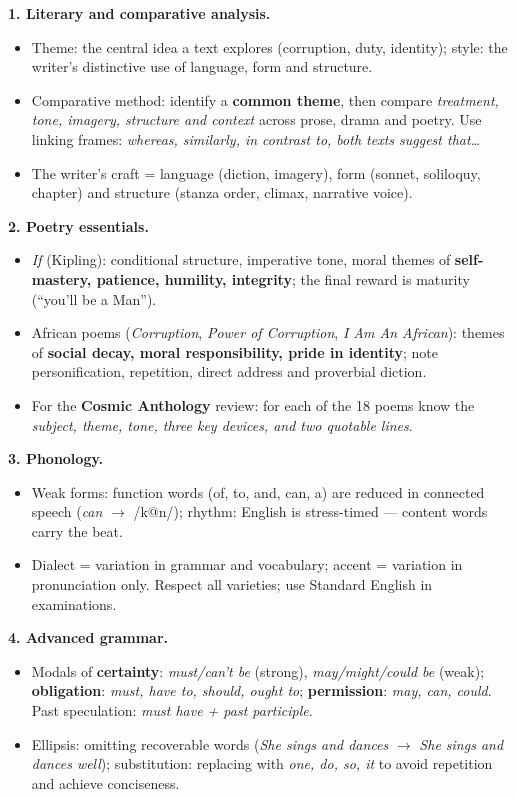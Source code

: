 \documentclass[11pt]{article}
\newcommand{\cle}[1]{{\popxbold\color{popdark}#1}}
\begin{document}
\begin{bilan}
\textbf{1. Literary and comparative analysis.}
\begin{itemize}
\item \cle{Theme}: the central idea a text explores (corruption, duty, identity); \cle{style}: the writer's distinctive use of language, form and structure.
\item Comparative method: identify a \textbf{common theme}, then compare \emph{treatment, tone, imagery, structure and context} across prose, drama and poetry. Use linking frames: \emph{whereas, similarly, in contrast to, both texts suggest that\ldots}
\item The \cle{writer's craft} = language (diction, imagery), form (sonnet, soliloquy, chapter) and structure (stanza order, climax, narrative voice).
\end{itemize}

\textbf{2. Poetry essentials.}
\begin{itemize}
\item \emph{If} (Kipling): conditional structure, imperative tone, moral themes of \textbf{self-mastery, patience, humility, integrity}; the final reward is maturity (``you'll be a Man'').
\item African poems (\emph{Corruption}, \emph{Power of Corruption}, \emph{I Am An African}): themes of \textbf{social decay, moral responsibility, pride in identity}; note personification, repetition, direct address and proverbial diction.
\item For the \textbf{Cosmic Anthology} review: for each of the 18 poems know the \emph{subject, theme, tone, three key devices, and two quotable lines}.
\end{itemize}

\textbf{3. Phonology.}
\begin{itemize}
\item \cle{Weak forms}: function words (of, to, and, can, a) are reduced in connected speech (\emph{can} $\to$ /k@n/); \cle{rhythm}: English is stress-timed --- content words carry the beat.
\item \cle{Dialect} = variation in grammar and vocabulary; \cle{accent} = variation in pronunciation only. Respect all varieties; use Standard English in examinations.
\end{itemize}

\textbf{4. Advanced grammar.}
\begin{itemize}
\item Modals of \textbf{certainty}: \emph{must/can't be} (strong), \emph{may/might/could be} (weak); \textbf{obligation}: \emph{must, have to, should, ought to}; \textbf{permission}: \emph{may, can, could}. Past speculation: \emph{must have + past participle}.
\item \cle{Ellipsis}: omitting recoverable words (\emph{She sings and dances} $\to$ \emph{She sings and dances well}); \cle{substitution}: replacing with \emph{one, do, so, it} to avoid repetition and achieve conciseness.
\end{itemize}


\end{bilan}
\end{document}
